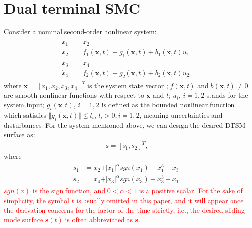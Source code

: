 \documentclass[3p]{elsarticle}
\theoremstyle{plain}
\theoremstyle{remark}
\begin{document}
\section{Dual terminal SMC}\label{sec:2}
Consider a nominal second-order nonlinear system:
\begin{align}
\begin{split}
\dot x_1 &= x_2\\
\dot x_2 &= f_1(\bm x,t)+g_1(\bm x,t)+b_1(\bm x,t)u_1\\
\dot x_3 &= x_4\\
\dot x_4 &= f_2(\bm x,t)+g_2(\bm x,t)+b_2(\bm x,t)u_2,\label{eq:second-order system}
\end{split}
\end{align}
where $\bm x = [x_1,x_2,x_3,x_4]^T$ is the system state vector ; $f(\bm x,t)$ and $b(\bm x,t)\neq 0$ are smooth nonlinear functions with respect to $\bm x$ and $t$; $u_i$, $i=1,2$ stands for the system input; $g_i(\bm x,t)$, $i=1,2$  is defined as the bounded nonlinear function which satisfies $\Vert g_i(\bm x,t)\Vert\le l_i$, $l_i>0, i=1,2$, meaning uncertainties and disturbances. For the system mentioned above, we can design the desired DTSM surface as:
\begin{align}
\bm s = [s_1,s_2]^T,
\end{align}
where
\begin{align}
\begin{split}
s_1 &= x_2+\vert x_1\vert^{\alpha} sgn(x_1)+x_1^3-x_3\\
s_2 &= x_4+\vert x_3\vert^{\alpha} sgn(x_3)+x_3^3+x_1.\label{eq:dual sliding mode  surface}
\end{split}
\end{align}
\textcolor{red}{$sgn(x)$ is the sign function, and $0<\alpha<1$ is a positive scalar. For the sake of simplicity, the symbol $t$ is usually omitted in this paper, and it will appear once the derivation concerns for the factor of the time strictly, i.e., the desired sliding mode  surface $\bm s(t)$ is often abbreviated as $\bm s$.}
\end{document}
